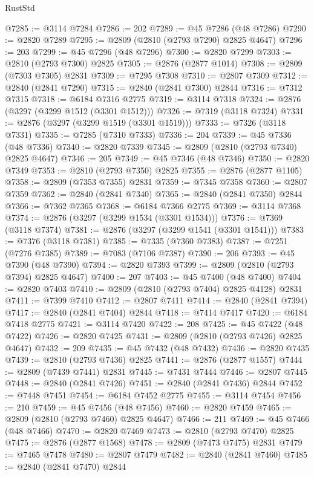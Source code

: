 \begin{lexlean}{RustStd}
\begin{coremodule}
@7285 := @3114 @7284
@7286 := 202
@7289 := @45 @7286 (@48 @7286)
@7290 := @2820 @7289
@7295 := @2809 (@2810 (@2793 @7290) @2825 @4647)
@7296 := 203
@7299 := @45 @7296 (@48 @7296)
@7300 := @2820 @7299
@7303 := @2810 (@2793 @7300) @2825
@7305 := @2876 (@2877 @1014)
@7308 := @2809 (@7303 @7305) @2831
@7309 := @7295 @7308
@7310 := @2807 @7309
@7312 := @2840 (@2841 @7290)
@7315 := @2840 (@2841 @7300) @2844
@7316 := @7312 @7315
@7318 := @6184 @7316 @2775
@7319 := @3114 @7318
@7324 := @2876 (@3297 (@3299 @1512 (@3301 @1512)))
@7326 := @7319 (@3118 @7324)
@7331 := @2876 (@3297 (@3299 @1519 (@3301 @1519)))
@7333 := @7326 (@3118 @7331)
@7335 := @7285 (@7310 @7333)
@7336 := 204
@7339 := @45 @7336 (@48 @7336)
@7340 := @2820 @7339
@7345 := @2809 (@2810 (@2793 @7340) @2825 @4647)
@7346 := 205
@7349 := @45 @7346 (@48 @7346)
@7350 := @2820 @7349
@7353 := @2810 (@2793 @7350) @2825
@7355 := @2876 (@2877 @1105)
@7358 := @2809 (@7353 @7355) @2831
@7359 := @7345 @7358
@7360 := @2807 @7359
@7362 := @2840 (@2841 @7340)
@7365 := @2840 (@2841 @7350) @2844
@7366 := @7362 @7365
@7368 := @6184 @7366 @2775
@7369 := @3114 @7368
@7374 := @2876 (@3297 (@3299 @1534 (@3301 @1534)))
@7376 := @7369 (@3118 @7374)
@7381 := @2876 (@3297 (@3299 @1541 (@3301 @1541)))
@7383 := @7376 (@3118 @7381)
@7385 := @7335 (@7360 @7383)
@7387 := @7251 (@7276 @7385)
@7389 := @7083 (@7106 @7387)
@7390 := 206
@7393 := @45 @7390 (@48 @7390)
@7394 := @2820 @7393
@7399 := @2809 (@2810 (@2793 @7394) @2825 @4647)
@7400 := 207
@7403 := @45 @7400 (@48 @7400)
@7404 := @2820 @7403
@7410 := @2809 (@2810 (@2793 @7404) @2825 @4128) @2831
@7411 := @7399 @7410
@7412 := @2807 @7411
@7414 := @2840 (@2841 @7394)
@7417 := @2840 (@2841 @7404) @2844
@7418 := @7414 @7417
@7420 := @6184 @7418 @2775
@7421 := @3114 @7420
@7422 := 208
@7425 := @45 @7422 (@48 @7422)
@7426 := @2820 @7425
@7431 := @2809 (@2810 (@2793 @7426) @2825 @4647)
@7432 := 209
@7435 := @45 @7432 (@48 @7432)
@7436 := @2820 @7435
@7439 := @2810 (@2793 @7436) @2825
@7441 := @2876 (@2877 @1557)
@7444 := @2809 (@7439 @7441) @2831
@7445 := @7431 @7444
@7446 := @2807 @7445
@7448 := @2840 (@2841 @7426)
@7451 := @2840 (@2841 @7436) @2844
@7452 := @7448 @7451
@7454 := @6184 @7452 @2775
@7455 := @3114 @7454
@7456 := 210
@7459 := @45 @7456 (@48 @7456)
@7460 := @2820 @7459
@7465 := @2809 (@2810 (@2793 @7460) @2825 @4647)
@7466 := 211
@7469 := @45 @7466 (@48 @7466)
@7470 := @2820 @7469
@7473 := @2810 (@2793 @7470) @2825
@7475 := @2876 (@2877 @1568)
@7478 := @2809 (@7473 @7475) @2831
@7479 := @7465 @7478
@7480 := @2807 @7479
@7482 := @2840 (@2841 @7460)
@7485 := @2840 (@2841 @7470) @2844

\end{coremodule}
\end{lexlean}
